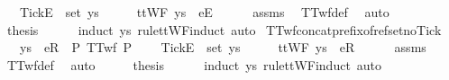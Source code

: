 \begin{isabellebody}
\ \ \ {\isachardoublequoteopen}{\isacharbrackleft}Tick{\isacharbrackright}\isactrlsub E\ {\isasymnotin}\ set\ ys{\isachardoublequoteclose}\isanewline
%
\isadelimproof
%
\endisadelimproof
%
\isatagproof
{}\isamarkupfalse%
\ {\isacharminus}\isanewline
\ \ \isamarkupfalse%
\ {\isachardoublequoteopen}ttWF\ {\isacharparenleft}ys\ {\isacharat}\ {\isacharbrackleft}{\isacharbrackleft}e{}{\isacharbrackright}\isactrlsub E{\isacharbrackright}{\isacharparenright}{\isachardoublequoteclose}\isanewline
\ \ \ \ \isamarkupfalse%
\ assms\ \isamarkupfalse%
\ TTwf{\isacharunderscore}def\ \isamarkupfalse%
\ auto\isanewline
\ \ \isamarkupfalse%
\ \isamarkupfalse%
\ {\isacharquery}thesis\isanewline
\ \ \ \ \isamarkupfalse%
\ {\isacharparenleft}induct\ ys\ rule{\isacharcolon}ttWF{\isachardot}induct{\isacharcomma}\ auto{\isacharparenright}\isanewline
{}\isamarkupfalse%
%
\endisatagproof
{\isafoldproof}%
%
\isadelimproof
\isanewline
%
\endisadelimproof
\isanewline
{}\isamarkupfalse%
\ TTwf{\isacharunderscore}concat{\isacharunderscore}prefix{\isacharunderscore}of{\isacharunderscore}ref{\isacharunderscore}set{\isacharunderscore}no{\isacharunderscore}Tick{\isacharcolon}\isanewline
\ \ \ {\isachardoublequoteopen}ys\ {\isacharat}\ {\isacharbrackleft}{\isacharbrackleft}e{}{\isacharbrackright}\isactrlsub R{\isacharbrackright}\ {\isasymin}\ P{\isachardoublequoteclose}\ {\isachardoublequoteopen}TTwf\ P{\isachardoublequoteclose}\ \isanewline
\ \ \ {\isachardoublequoteopen}{\isacharbrackleft}Tick{\isacharbrackright}\isactrlsub E\ {\isasymnotin}\ set\ ys{\isachardoublequoteclose}\isanewline
%
\isadelimproof
%
\endisadelimproof
%
\isatagproof
{}\isamarkupfalse%
\ {\isacharminus}\isanewline
\ \ \isamarkupfalse%
\ {\isachardoublequoteopen}ttWF\ {\isacharparenleft}ys\ {\isacharat}\ {\isacharbrackleft}{\isacharbrackleft}e{}{\isacharbrackright}\isactrlsub R{\isacharbrackright}{\isacharparenright}{\isachardoublequoteclose}\isanewline
\ \ \ \ \isamarkupfalse%
\ assms\ \isamarkupfalse%
\ TTwf{\isacharunderscore}def\ \isamarkupfalse%
\ auto\isanewline
\ \ \isamarkupfalse%
\ \isamarkupfalse%
\ {\isacharquery}thesis\isanewline
\ \ \ \ \isamarkupfalse%
\ {\isacharparenleft}induct\ ys\ rule{\isacharcolon}ttWF{\isachardot}induct{\isacharcomma}\ auto{\isacharparenright}\isanewline

\end{isabellebody}
